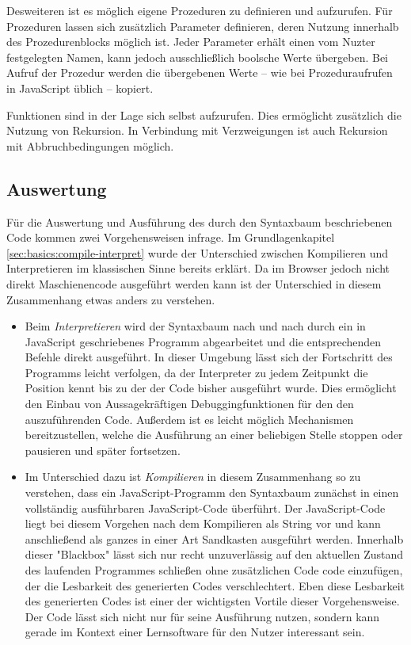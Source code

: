 Desweiteren ist es möglich eigene Prozeduren zu definieren und aufzurufen. Für Prozeduren lassen sich zusätzlich Parameter definieren, deren Nutzung innerhalb des Prozedurenblocks möglich ist. Jeder Parameter erhält einen vom Nuzter festgelegten Namen, kann jedoch ausschließlich boolsche Werte übergeben. Bei Aufruf der Prozedur werden die übergebenen Werte -- wie bei Prozeduraufrufen in JavaScript üblich -- kopiert.

Funktionen sind in der Lage sich selbst aufzurufen. Dies ermöglicht zusätzlich die Nutzung von Rekursion. In Verbindung mit Verzweigungen ist auch Rekursion mit Abbruchbedingungen möglich.

\subsection{Auswertung}
\label{sec:implementation:program:evaluation}

Für die Auswertung und Ausführung des durch den Syntaxbaum beschriebenen Code kommen zwei Vorgehensweisen infrage. Im Grundlagenkapitel \ref{sec:basics:compile-interpret} wurde der Unterschied zwischen Kompilieren und Interpretieren im klassischen Sinne bereits erklärt. Da im Browser jedoch nicht direkt Maschienencode ausgeführt werden kann ist der Unterschied in diesem Zusammenhang etwas anders zu verstehen.

\begin{itemize}
  \item Beim \emph{Interpretieren} wird der Syntaxbaum nach und nach durch ein in JavaScript geschriebenes Programm abgearbeitet und die entsprechenden Befehle direkt ausgeführt. In dieser Umgebung lässt sich der Fortschritt des Programms leicht verfolgen, da der Interpreter zu jedem Zeitpunkt die Position kennt bis zu der der Code bisher ausgeführt wurde. Dies ermöglicht den Einbau von Aussagekräftigen Debuggingfunktionen für den den auszuführenden Code. Außerdem ist es leicht möglich Mechanismen bereitzustellen, welche die Ausführung an einer beliebigen Stelle stoppen oder pausieren und später fortsetzen.
  \item Im Unterschied dazu ist \emph{Kompilieren} in diesem Zusammenhang so zu verstehen, dass ein JavaScript-Programm den Syntaxbaum zunächst in einen vollständig ausführbaren JavaScript-Code überführt. Der JavaScript-Code liegt bei diesem Vorgehen nach dem Kompilieren als String vor und kann anschließend als ganzes in einer Art Sandkasten ausgeführt werden. Innerhalb dieser "Blackbox" lässt sich nur recht unzuverlässig auf den aktuellen Zustand des laufenden Programmes schließen ohne zusätzlichen Code code einzufügen, der die Lesbarkeit des generierten Codes verschlechtert. Eben diese Lesbarkeit des generierten Codes ist einer der wichtigsten Vortile dieser Vorgehensweise. Der Code lässt sich nicht nur für seine Ausführung nutzen, sondern kann gerade im Kontext einer Lernsoftware für den Nutzer interessant sein.
\end{itemize}


